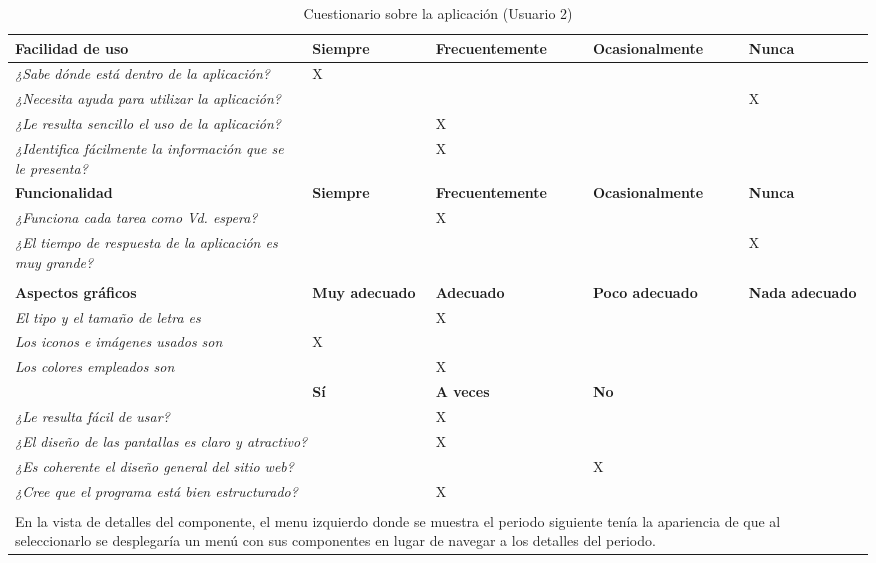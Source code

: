 \begin{table}[H]
\centering
\caption{Cuestionario sobre la aplicación (Usuario 2)}
\begin{tabular}{p{15em}|p{4em}|p{7.5em}|p{7.5em}|p{3em}}
\toprule
\rowcolor[rgb]{.949,  .949,  .949} \textbf{Facilidad de uso} & \textbf{Siempre} & \textbf{Frecuentemente} & \textbf{Ocasionalmente} & \textbf{Nunca} \\ \midrule
\textit{¿Sabe dónde está dentro de la aplicación?} & X& & & \\ \midrule
\textit{¿Necesita ayuda para utilizar la aplicación?} & & & & X\\ \midrule
\textit{¿Le resulta sencillo el uso de la aplicación?} & &X & & \\ \midrule
\textit{¿Identifica fácilmente la información que se le presenta?} & &X & & \\ \midrule
\rowcolor[rgb]{.949,  .949,  .949} \textbf{Funcionalidad} & \textbf{Siempre} & \textbf{Frecuentemente} & \textbf{Ocasionalmente} & \textbf{Nunca} \\ \midrule
\textit{¿Funciona cada tarea como Vd. espera?} & &X & & \\ \midrule
\textit{¿El tiempo de respuesta de la aplicación es muy grande?} & & & &X \\ \midrule
\rowcolor[rgb]{ .851,  .886,  .953} \multicolumn{5}{p{36em}}{\textbf{Calidad del interfaz}} \\ \midrule
\rowcolor[rgb]{.949,  .949,  .949} \textbf{Aspectos gráficos} & \textbf{Muy adecuado} & \textbf{Adecuado} & \textbf{Poco adecuado} & \textbf{Nada adecuado} \\ \midrule
\textit{El tipo y el tamaño de letra es} & & X& & \\ \midrule
\textit{Los iconos e imágenes usados son} &X & & & \\ \midrule
\textit{Los colores empleados son} & &X & & \\ \midrule
\rowcolor[rgb]{.949,  .949,  .949}\multicolumn{2}{p{19em}|}{\textbf{Diseño de la interfaz}} & \textbf{Sí} & \textbf{A veces} & \textbf{No} \\ \midrule
\multicolumn{2}{p{19em}|}{\textit{¿Le resulta fácil de usar?}} &X & & \\ \midrule
\multicolumn{2}{p{19em}|}{\textit{¿El diseño de las pantallas es claro y atractivo?}} &X & & \\ \midrule
\multicolumn{2}{p{19em}|}{\textit{¿Es coherente el diseño general del sitio web?}} & &X & \\ \midrule
\multicolumn{2}{p{19em}|}{\textit{¿Cree que el programa está bien estructurado?}} &X & & \\ \midrule
\rowcolor[rgb]{ .851,  .886,  .953}\multicolumn{5}{p{36em}}{\textbf{Observaciones}} \\ \midrule
\multicolumn{5}{p{36em}}{En la vista de detalles del componente, el menu izquierdo donde se muestra el periodo siguiente tenía la apariencia de que al seleccionarlo se desplegaría un menú con sus componentes en lugar de navegar a los detalles del periodo.} \\ \bottomrule
\end{tabular}
\end{table}

